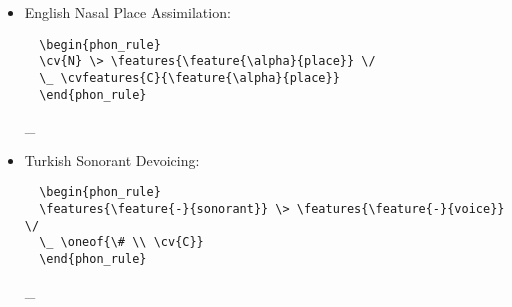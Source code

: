 \documentclass[11pt]{article}
\begin{document}
\begin{itemize}
\begin{verbatim}
  \begin{phon_rule}
  \null \> \phone{@} \/
  \features{\feature{+}{sib.}} \_ \features{\feature{+}{sib.}} \#
  \end{phon_rule}
\end{verbatim}

\begin{phon_rule}
\null \>  \/
 \_  \#
\end{phon_rule}

\item English Nasal Place Assimilation:

\begin{verbatim}
  \begin{phon_rule}
  \cv{N} \> \features{\feature{\alpha}{place}} \/
  \_ \cvfeatures{C}{\feature{\alpha}{place}}
  \end{phon_rule}
\end{verbatim}

\begin{phon_rule}
 \>  \/
\_ 
\end{phon_rule}

\item Turkish Sonorant Devoicing:

\begin{verbatim}
  \begin{phon_rule}
  \features{\feature{-}{sonorant}} \> \features{\feature{-}{voice}} \/
  \_ \oneof{\# \\ \cv{C}}
  \end{phon_rule}
\end{verbatim}

\begin{phon_rule}
 \>  \/
\_ 
\end{phon_rule}

\end{itemize}
\end{document}
